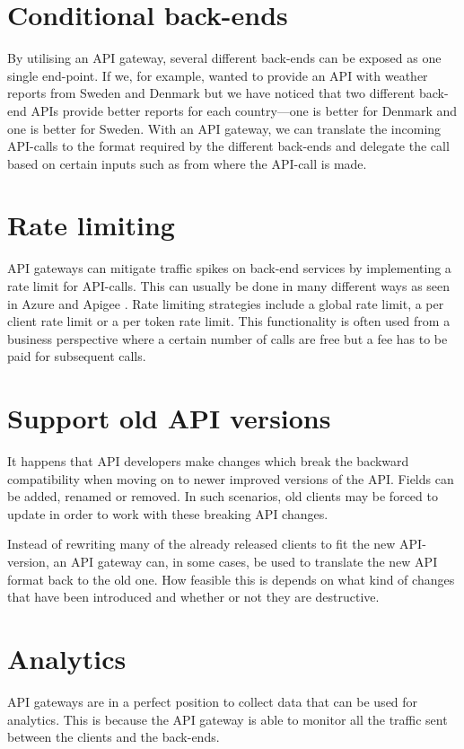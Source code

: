 \documentclass{cslthse-msc}
\begin{document}
\section{Conditional back-ends}
By utilising an API gateway, several different back-ends can be exposed as one single end-point. If we, for example, wanted to provide an API with weather reports from Sweden and Denmark but we have noticed that two different back-end APIs provide better reports for each country---one is better for Denmark and one is better for Sweden. With an API gateway, we can translate the incoming API-calls to the format required by the different back-ends and delegate the call based on certain inputs such as from where the API-call is made.

\section{Rate limiting}
API gateways can mitigate traffic spikes on back-end services by implementing a rate limit for API-calls. This can usually be done in many different ways as seen in Azure \cite{azure_rate_limit} and Apigee \cite{apigee_rate_limit}. Rate limiting strategies include a global rate limit, a per client rate limit or a per token rate limit. This functionality is often used from a business perspective where a certain number of calls are free but a fee has to be paid for subsequent calls.

\section{Support old API versions}
It happens that API developers make changes which break the backward compatibility when moving on to newer improved versions of the API. Fields can be added, renamed or removed. In such scenarios, old clients may be forced to update in order to work with these breaking API changes.

Instead of rewriting many of the already released clients to fit the new API-version, an API gateway can, in some cases, be used to translate the new API format back to the old one. How feasible this is depends on what kind of changes that have been introduced and whether or not they are destructive.

\section{Analytics}
API gateways are in a perfect position to collect data that can be used for analytics. This is because the API gateway is able to monitor all the traffic sent between the clients and the back-ends. 
\end{document}
